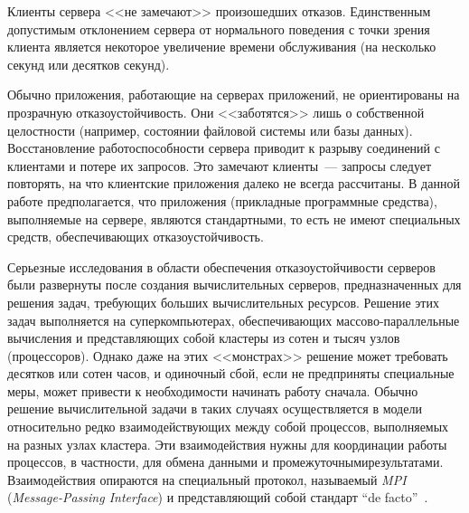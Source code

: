 \begin{multicols}{2}
{Клиенты сервера <<не замечают>> произошедших отказов. Единственным
допустимым отклонением сервера от нормального поведения с точки зрения
клиента является некоторое увеличение времени обслуживания (на несколько
секунд или десятков секунд).

Обычно приложения, работающие на серверах приложений, не
ориентированы на прозрачную отказоустойчивость. Они <<заботятся>> лишь о
собственной целостности (например, состоянии файловой системы или базы
данных). Восстановление работоспособности сервера приводит к разрыву
соединений с клиентами и потере их запросов. Это замечают клиенты~---
запросы следует повторять, на что клиентские приложения далеко не всегда
рассчитаны. В данной работе предполагается, что приложения (прикладные
программные средства), выполняемые на сервере, являются стандартными, то
есть не имеют специальных средств, обеспечивающих отказоустойчивость.

Серьезные исследования в области обеспечения отказоустойчивости
серверов были развернуты после создания вычислительных серверов,
предназначенных для решения задач, требующих больших вычислительных
ресурсов. Решение этих задач выполняется на суперкомпьютерах,
обеспечивающих массово-параллельные вычисления и представляющих собой
кластеры из сотен и тысяч узлов (процессоров). Однако даже на этих
<<монстрах>> решение может требовать десятков или сотен часов, и
одиночный сбой, если не предприняты специальные меры, может привести к
необходимости начинать работу сначала. Обычно решение вычислительной
задачи в таких случаях осуществляется в модели относительно
 редко
взаимодействующих между собой процессов, выполняемых на разных узлах кластера. 
Эти взаимодействия нужны для координации работы процессов, в частности, для 
обмена  данными и промежуточными\linebreak результатами. Взаимодействия 
опираются на специальный протокол, называемый \textit{MPI} 
(\textit{Message-Passing Interface}) и представляющий собой стандарт ``de 
facto''~\cite{3zak}.

}
\end{multicols}
